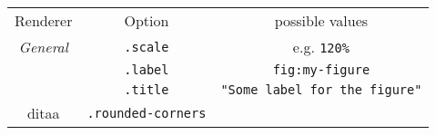 \documentclass[]{article}
\begin{document}
\begin{longtable}[c]{@{}ccc@{}}
\toprule\addlinespace
\begin{minipage}[b]{0.28\columnwidth}\centering
Renderer
\end{minipage} & \begin{minipage}[b]{0.33\columnwidth}\centering
Option
\end{minipage} & \begin{minipage}[b]{0.25\columnwidth}\centering
possible values
\end{minipage}
\\\addlinespace
\midrule\endhead
\begin{minipage}[t]{0.28\columnwidth}\centering
\emph{General}
\end{minipage} & \begin{minipage}[t]{0.33\columnwidth}\centering
\texttt{.scale}
\end{minipage} & \begin{minipage}[t]{0.25\columnwidth}\centering
e.g. \texttt{120\%}
\end{minipage}
\\\addlinespace
\begin{minipage}[t]{0.28\columnwidth}\centering
\end{minipage} & \begin{minipage}[t]{0.33\columnwidth}\centering
\texttt{.label}
\end{minipage} & \begin{minipage}[t]{0.25\columnwidth}\centering
\texttt{fig:my-figure}
\end{minipage}
\\\addlinespace
\begin{minipage}[t]{0.28\columnwidth}\centering
\end{minipage} & \begin{minipage}[t]{0.33\columnwidth}\centering
\texttt{.title}
\end{minipage} & \begin{minipage}[t]{0.25\columnwidth}\centering
\texttt{"Some label for the figure"}
\end{minipage}
\\\addlinespace
\begin{minipage}[t]{0.28\columnwidth}\centering
ditaa
\end{minipage} & \begin{minipage}[t]{0.33\columnwidth}\centering
\texttt{.rounded-corners}
\end{minipage} & \begin{minipage}[t]{0.25\columnwidth}\centering

\end{minipage}
\end{longtable}
\end{document}
